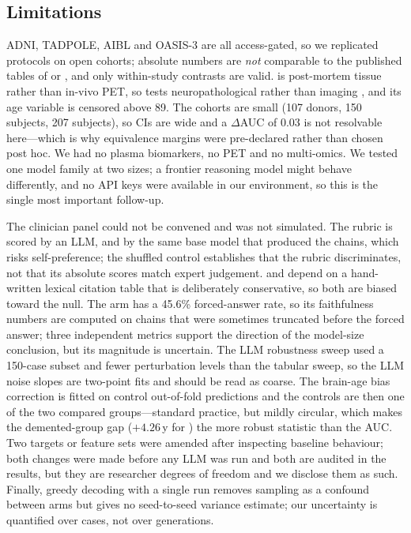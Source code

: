 \subsection{Limitations}

 ADNI, TADPOLE, AIBL and OASIS-3 are all access-gated, so we replicated
protocols on open cohorts; absolute numbers are \emph{not} comparable to the published tables of
\citet{ding2025l2ctabpfn} or \citet{kearney2026tapgpt}, and only within-study contrasts are valid.
\act is post-mortem tissue rather than in-vivo PET, so \taskone tests neuropathological rather than
imaging \atn, and its age variable is censored above 89. The cohorts are small (107 donors, 150
subjects, 207 subjects), so CIs are wide and a $\Delta$AUC of 0.03 is not resolvable here---which is
why equivalence margins were pre-declared rather than chosen post hoc. We had no plasma biomarkers,
no PET and no multi-omics. We tested one model family at two sizes; a frontier reasoning model might
behave differently, and no API keys were available in our environment, so this is the single most
important follow-up.

 The clinician panel could not be convened and was not simulated. The rubric is
scored by an LLM, and by the same base model that produced the chains, which risks self-preference;
the shuffled control establishes that the rubric discriminates, not that its absolute scores match
expert judgement. \cfit and \esa depend on a hand-written lexical citation table that is
deliberately conservative, so both are biased toward the null. The \qwensmall \cotarm arm has a 45.6\%
forced-answer rate, so its faithfulness numbers are computed on chains that were sometimes truncated
before the forced answer; three independent metrics support the direction of the model-size
conclusion, but its magnitude is uncertain. The LLM robustness sweep used a 150-case subset and
fewer perturbation levels than the tabular sweep, so the LLM noise slopes are two-point fits and
should be read as coarse. The brain-age bias correction is fitted on control out-of-fold predictions
and the controls are then one of the two compared groups---standard practice, but mildly circular,
which makes the demented-group gap ($+4.26$\,y for \tabpfn) the more robust statistic than the AUC.
Two targets or feature sets were amended after inspecting baseline behaviour; both changes were made
before any LLM was run and both are audited in the results, but they are researcher degrees of
freedom and we disclose them as such. Finally, greedy decoding with a single run removes sampling as
a confound between arms but gives no seed-to-seed variance estimate; our uncertainty is quantified
over cases, not over generations.

